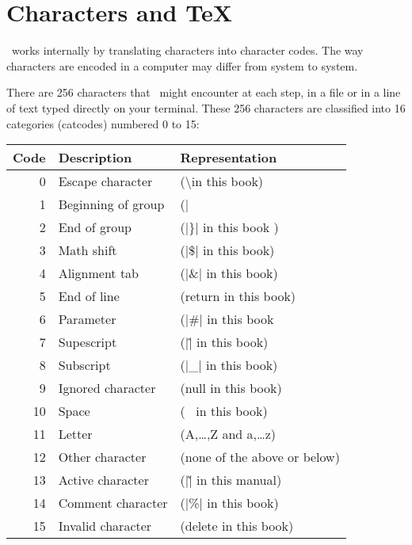 \chapter{Characters and TeX}
\label{ch:characters}

\normalsize

\tex\ works internally by translating characters into character codes. The way characters are encoded in a computer may differ from system to system.

There are 256 characters that \tex\  might encounter at
each step, in a file or in a line of text typed directly on your terminal. These
256 characters are classified into 16 categories (catcodes) numbered 0 to 15:



\begin{table}[htbp]
\centering
\begin{tabular}{rll}
\toprule
Code & Description & Representation\\
\midrule
0 & Escape character & (\textbackslash in this book)\\
1 & Beginning of group & (|{| in this book)\\
2 & End of group & (|\}| in this book )\\
3 & Math shift & (|\$| in this book)\\
4 & Alignment tab & (|\&| in this book)\\
5 & End of line &(return in this book)\\
6 & Parameter &(|\#| in this book\\
7 & Supescript &(|\^| in this book)\\
8 & Subscript &(|\_| in this book)\\
9 & Ignored character &(null in this book)\\
10 & Space &(\verb*+ + in this book)\\
11 &Letter &(A,\ldots,Z and a,\ldots z)\\
12 &Other character &(none of the above or below)\\
13 &Active character &(|\~| in this manual)\\
14 &Comment character &(|\%| in this book)\\
15 &Invalid character &(delete in this book)\\
\bottomrule
\end{tabular}
\end{table}
\medskip

